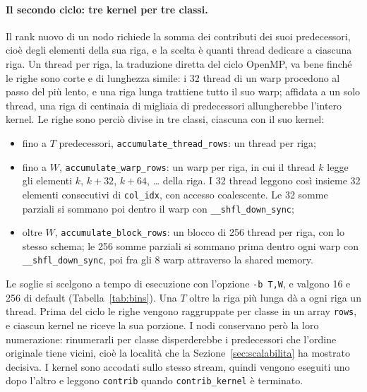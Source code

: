 \documentclass[11pt,a4paper]{article}
\begin{document}
\paragraph{Il secondo ciclo: tre kernel per tre classi.}
Il rank nuovo di un nodo richiede la somma dei contributi dei suoi
predecessori, cioè degli elementi della sua riga, e la scelta è quanti thread
dedicare a ciascuna riga. Un thread per riga, la traduzione diretta
del ciclo OpenMP, va bene finché le righe sono corte e di lunghezza simile: i
32 thread di un warp procedono al passo del più lento, e una riga lunga
trattiene tutto il suo warp; affidata a un solo thread, una riga di centinaia
di migliaia di predecessori allungherebbe l'intero kernel. Le righe sono
perciò divise in tre classi, ciascuna con il suo kernel:
\begin{itemize}\itemsep2pt
  \item fino a $T$ predecessori, \texttt{accumulate\_thread\_rows}: un
    thread per riga;
  \item fino a $W$, \texttt{accumulate\_warp\_rows}: un warp per riga, in
    cui il thread $k$ legge gli elementi $k$, $k+32$, $k+64$, \dots{} della
    riga. I 32 thread leggono così insieme 32 elementi consecutivi di
    \texttt{col\_idx}, con accesso coalescente. Le 32 somme parziali si
    sommano poi dentro il warp con \texttt{\_\_shfl\_down\_sync};
  \item oltre $W$, \texttt{accumulate\_block\_rows}: un blocco di 256
    thread per riga, con lo stesso schema; le 256 somme parziali si sommano
    prima dentro ogni warp con \texttt{\_\_shfl\_down\_sync}, poi fra gli 8
    warp attraverso la shared memory.
\end{itemize}
Le soglie si scelgono a tempo di esecuzione con l'opzione
\texttt{-b T,W}, e valgono 16 e 256 di default (Tabella~\ref{tab:bins}).
Una $T$ oltre la riga più lunga dà a ogni riga un thread.
Prima del ciclo le righe vengono raggruppate per classe in un
array \texttt{rows}, e ciascun kernel ne riceve la sua porzione. I nodi
conservano però la loro numerazione: rinumerarli per classe disperderebbe i
predecessori che l'ordine originale tiene vicini, cioè la località che la
Sezione~\ref{sec:scalabilita} ha mostrato decisiva. I kernel sono accodati
sullo stesso stream, quindi vengono eseguiti uno dopo l'altro e leggono
\texttt{contrib} quando \texttt{contrib\_kernel} è terminato.
\end{document}
